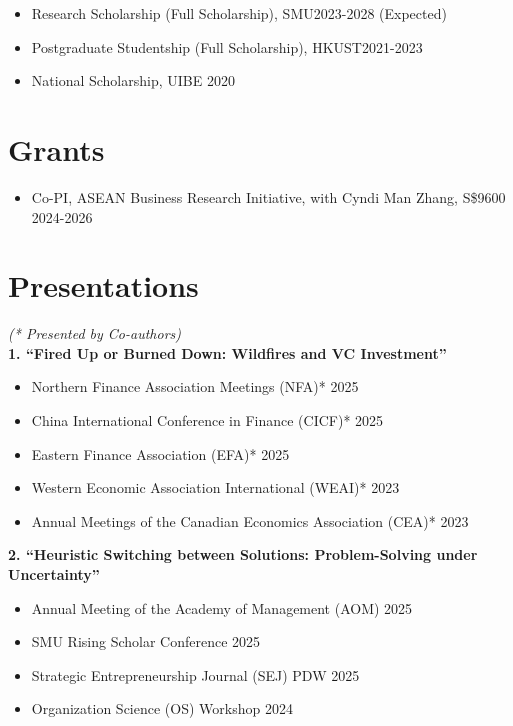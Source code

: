 \documentclass[a4paper,10pt]{article}
\begin{document}
\begin{itemize}[itemsep=2pt,label=$\bullet$]
    \item{Research Scholarship  (Full Scholarship), SMU}\hfill{2023-2028 (Expected)}
    \item{Postgraduate Studentship (Full Scholarship), HKUST}\hfill{2021-2023}
    \item{National Scholarship, UIBE} \hfill{2020}
\end{itemize}

\section{Grants}

\begin{itemize}[itemsep=2pt,label=$\bullet$]
    \item{Co-PI, ASEAN Business Research Initiative, with Cyndi Man Zhang, S\$9600} \hfill{2024-2026}
\end{itemize}

\section{Presentations}  
{\textit{(* Presented by Co-authors)}} \\
\vspace{3pt}
\hspace{1.5em}\textbf{1. ``Fired Up or Burned Down: Wildfires and VC Investment''} 
\begin{itemize}[leftmargin=0.5in]
    \item Northern Finance Association Meetings (NFA)* \hfill 2025
    \item China International Conference in Finance (CICF)* \hfill 2025
    \item Eastern Finance Association (EFA)* \hfill 2025
    \item Western Economic Association International (WEAI)* \hfill 2023
    \item Annual Meetings of the Canadian Economics Association (CEA)* \hfill 2023
\end{itemize}
\vspace{5pt}

\hspace{1.5em}\textbf{2. ``Heuristic Switching between Solutions: Problem-Solving under Uncertainty''} 
\begin{itemize}[leftmargin=0.5in]
    \item Annual Meeting of the Academy of Management (AOM) \hfill 2025
    \item SMU Rising Scholar Conference \hfill 2025
    \item Strategic Entrepreneurship Journal (SEJ) PDW \hfill 2025
    \item Organization Science (OS) Workshop \hfill 2024
\end{itemize}
\end{document}
